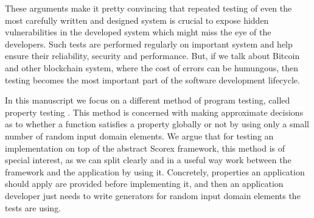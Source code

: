 These arguments make it pretty convincing that repeated testing of even the most carefully written and designed system is crucial to expose hidden vulnerabilities in the developed system which might miss the eye of the developers. Such tests are performed regularly on important system and help ensure their reliability, security and performance. But, if we talk about Bitcoin and other blockchain system, where the cost of errors can be humungous, then testing becomes the most important part of the software development lifecycle.

In this manuscript we focus on a different method of program testing, called property testing \cite{ron2001property}. This method is concerned with making approximate decisions as to whether a function satisfies a property globally or not by using only a small number of random input domain elements. We argue that for testing an implementation on top of the abstract Scorex framework, this method is of special interest, as we can split clearly and in a useful way work between the framework and the application by using it. Concretely, properties an application should apply are provided before implementing it, and then an application developer just needs to write generators for random input domain elements the tests are using.   
\nocite{holzmann1995improvement}
\nocite{zaki2008formal}




